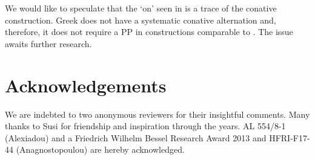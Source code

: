 \documentclass[output=paper]{langscibook}
\begin{document}
We would like to speculate that the ‘on’ seen in  is a trace of the conative construction. 
Greek does not have a systematic conative alternation and, therefore, it does not require a PP in constructions comparable to . 
The issue awaits further research.

\section*{Acknowledgements}

We are indebted to two anonymous reviewers for their insightful comments. 
Many thanks to Susi for friendship and inspiration through the years. 
AL 554/8-1 (Alexiadou) and a Friedrich Wilhelm Bessel Research Award 2013 and HFRI-F17-44 (Anagnostopoulou) are hereby acknowledged.

\sloppy\printbibliography[heading=subbibliography,notkeyword=this]
\end{document}
